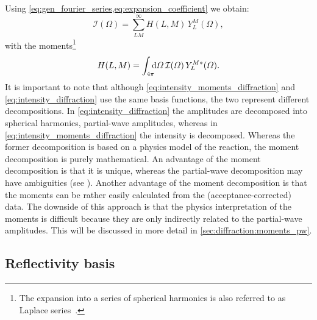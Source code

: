 Using \cref{eq:gen_fourier_series,eq:expansion_coefficient} we obtain:
\begin{equation}
  \label{eq:intensity_moments_diffraction}
  \mathcal{I}(\Omega)
  = \sum_{L M}^\infty H(L, M)\, Y_L^M(\Omega),
\end{equation}
with the moments\footnote{The expansion into a series of spherical
harmonics is also referred to as Laplace
series~\cite{MathWorld:LaplaceSeries}.}
\begin{equation}
  \label{eq:moments_diffraction}
  H(L, M)
  = \int_{4 \pi}\!\!\! \dif{\Omega}\, \mathcal{I}(\Omega)\, Y_L^{M *}(\Omega).
\end{equation}
It is important to note that although
\cref{eq:intensity_moments_diffraction} and
\cref{eq:intensity_diffraction} use the same basis functions, the two
represent different decompositions.  In
\cref{eq:intensity_diffraction} the amplitudes are decomposed into
spherical harmonics, \ie partial-wave amplitudes, whereas in
\cref{eq:intensity_moments_diffraction} the intensity is decomposed.
Whereas the former decomposition is based on a physics model of the
reaction, the moment decomposition is purely mathematical.  An
advantage of the moment decomposition is that it is unique, whereas
the partial-wave decomposition may have ambiguities (see \eg
{}).  Another advantage of the moment
decomposition is that the moments can be rather easily calculated from
the (acceptance-corrected) data.  The downside of this approach is
that the physics interpretation of the moments is difficult because
they are only indirectly related to the partial-wave amplitudes.  This
will be discussed in more detail in \cref{sec:diffraction:moments_pw}.


\subsection{Reflectivity basis}%
\label{sec:diffraction:reflectivity}

